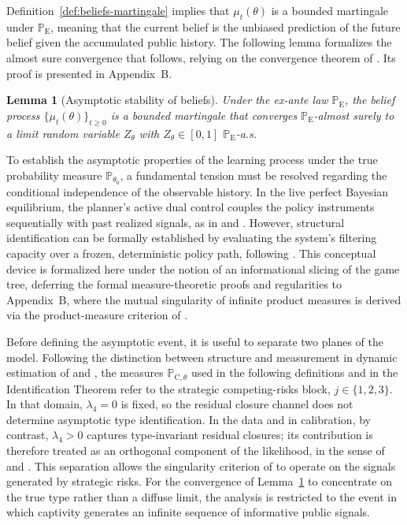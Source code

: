 \documentclass[review,authoryear,12pt]{elsarticle}
\theoremstyle{plain}
\newtheorem{lemma}[theorem]{Lemma}
\theoremstyle{definition}
\newcommand{\ProbE}{\mathbb{P}_{\mathrm{E}}}
\newcommand{\ProbC}[1]{\mathbb{P}_{\mathrm{C},#1}}
\newcommand{\1}{\mathbf{1}}
\begin{document}
Definition~\ref{def:beliefs-martingale} implies that $\mu_t(\theta)$ is a bounded martingale under $\ProbE$, meaning that the current belief is the unbiased prediction of the future belief given the accumulated public history. The following lemma formalizes the almost sure convergence that follows, relying on the convergence theorem of \citet{Doob1953Stochastic}. Its proof is presented in Appendix~B.

\begin{lemma}[Asymptotic stability of beliefs]\label{lem:asymptotic-beliefs}
Under the ex-ante law $\ProbE$, the belief process $\{\mu_t(\theta)\}_{t\ge 0}$ is a bounded martingale that converges $\ProbE$-almost surely to a limit random variable $Z_\theta$ with $Z_\theta\in[0,1]$ $\ProbE$-a.s.
\end{lemma}

\smallskip

To establish the asymptotic properties of the learning process under the true probability measure $\mathbb{P}_{\theta_0}$, a fundamental tension must be resolved regarding the conditional independence of the observable history. In the live perfect Bayesian equilibrium, the planner's active dual control couples the policy instruments sequentially with past realized signals, as in \citet{AghionBoltonHarrisJullien1991} and \citet{EasleyKiefer1988}. However, structural identification can be formally established by evaluating the system's filtering capacity over a frozen, deterministic policy path, following \citet{BlackwellDubins1962}. This conceptual device is formalized here under the notion of an informational slicing of the game tree, deferring the formal measure-theoretic proofs and regularities to Appendix~B, where the mutual singularity of infinite product measures is derived via the product-measure criterion of \citet{Kakutani1948}.

Before defining the asymptotic event, it is useful to separate two planes of the model. Following the distinction between structure and measurement in dynamic estimation of \citet{Rust1987} and \citet{MagnacThesmar2002}, the measures $\ProbC{\theta}$ used in the following definitions and in the Identification Theorem refer to the strategic competing-risks block, $j\in\{1,2,3\}$. In that domain, $\lambda_4=0$ is fixed, so the residual closure channel does not determine asymptotic type identification. In the data and in calibration, by contrast, $\lambda_4>0$ captures type-invariant residual closures; its contribution is therefore treated as an orthogonal component of the likelihood, in the sense of \citet{Lancaster1990} and \citet{AbbringVanDenBerg2003}. This separation allows the singularity criterion of \citet{Kakutani1948} to operate on the signals generated by strategic risks. For the convergence of Lemma~\ref{lem:asymptotic-beliefs} to concentrate on the true type rather than a diffuse limit, the analysis is restricted to the event in which captivity generates an infinite sequence of informative public signals.
\end{document}
